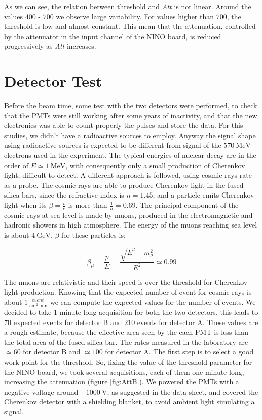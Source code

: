 As we can see, the relation between threshold and \textit{Att} is not linear. Around the values $400$ - $700$ we observe large variability. For values higher than $700$, the threshold is low and almost constant. This mean that the attenuation, controlled by the attenuator in the input channel of the NINO board, is reduced progressively as 	\textit{Att} increases. 

\section{Detector Test}

Before the beam time, some test with the two detectors were performed, to check that the PMTs were still working after some years of inactivity, and that the new electronics was able to count properly the pulses and store the data. For this studies, we didn't have a radioactive sources to employ. Anyway the signal shape using radioactive sources is expected to be different from signal of the $\SI{570}{\mega \electronvolt}$ electrons used in the experiment. The typical energies of nuclear decay are in the order of $E \simeq \SI{1}{\mega \electronvolt}$,  with consequently only a small production of Cherenkov light, difficult to detect. A different approach is followed, using cosmic rays rate as a probe. 
The cosmic rays are able to produce Cherenkov light in the fused-silica bars, since the refractive index is $n = 1.45$, and a particle emits Cherenkov light when its $\beta = \frac{v}{c}$ is more than $\frac{1}{n} = 0.69$. The principal component of the cosmic rays at sea level is made by muons, produced in the electromagnetic and hadronic showers in high atmosphere. The energy of the muons reaching sea level is about $\SI{4}{\giga \electronvolt}$, $\beta$ for these particles is:

\begin{equation}
\beta_{\mu} = \dfrac{p}{E} = \dfrac{\sqrt{E^{2} - m_{\mu}^{2}}}{ E^{2}} \simeq 0.99
\end{equation}

The muons are relativistic and their speed is over the threshold for Cherenkov light production. Knowing that the expected number of event for cosmic rays is about $1 \frac{event}{\SI{}{\centi \meter\squared} \SI{}{\minute}}$ we can compute the expected values for the number of events. We decided to take 1 minute long acquisition for both the two detectors, this leads to $70$ expected events for detector B  and  $210$ events for detector A. These values are a rough estimate, because the effective area seen by the each PMT is less than the total area of the fused-silica bar. The rates measured in the laboratory are $\simeq 60$ for detector B and $\simeq 100$ for detector A.     
The first step is to select a good work point for the threshold. So, fixing the value of the threshold parameter for the NINO board, we took several acquisitions, each of them one minute long, increasing the attenuation (figure \ref{fig:AttB}). We powered the PMTs with a negative voltage around $\SI{-1000}{\volt}$, as suggested in the data-sheet, and covered the Cherenkov detector with a shielding blanket, to avoid ambient light simulating a signal.

